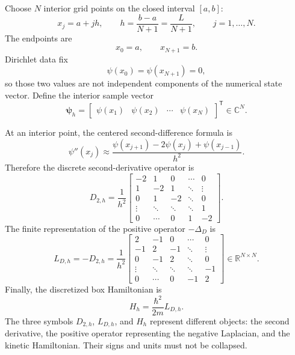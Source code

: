 Choose \(N\) interior grid points on the closed interval \([a,b]\):
\begin{equation}
  x_j=a+jh,
  \qquad
  h=\frac{b-a}{N+1}=\frac{L}{N+1},
  \qquad
  j=1,\ldots,N.
\end{equation}
The endpoints are
\begin{equation}
  x_0=a,
  \qquad
  x_{N+1}=b.
\end{equation}
Dirichlet data fix
\begin{equation}
  \psi(x_0)=\psi(x_{N+1})=0,
\end{equation}
so those two values are not independent components of the numerical state
vector. Define the interior sample vector
\begin{equation}
  \boldsymbol\psi_h
  =
  \begin{bmatrix}
    \psi(x_1) & \psi(x_2) & \cdots & \psi(x_N)
  \end{bmatrix}^{\mathsf T}
  \in\mathbb C^N.
\end{equation}

At an interior point, the centered second-difference formula is
\begin{equation}
  \psi''(x_j)
  \approx
  \frac{\psi(x_{j+1})-2\psi(x_j)+\psi(x_{j-1})}{h^2}.
\end{equation}
Therefore the discrete second-derivative operator is
\begin{equation}
  D_{2,h}
  =\frac{1}{h^2}
  \begin{bmatrix}
    -2 & 1 & 0 & \cdots & 0\\
    1 & -2 & 1 & \ddots & \vdots\\
    0 & 1 & -2 & \ddots & 0\\
    \vdots & \ddots & \ddots & \ddots & 1\\
    0 & \cdots & 0 & 1 & -2
  \end{bmatrix}.
\end{equation}
The finite representation of the positive operator \(-\Delta_D\) is
\begin{equation}
  L_{D,h}=-D_{2,h}
  =\frac{1}{h^2}
  \begin{bmatrix}
    2 & -1 & 0 & \cdots & 0\\
    -1 & 2 & -1 & \ddots & \vdots\\
    0 & -1 & 2 & \ddots & 0\\
    \vdots & \ddots & \ddots & \ddots & -1\\
    0 & \cdots & 0 & -1 & 2
  \end{bmatrix}
  \in\mathbb R^{N\times N}.
\end{equation}
Finally, the discretized box Hamiltonian is
\begin{equation}
  H_h=\frac{\hbar^2}{2m}L_{D,h}.
\end{equation}
The three symbols \(D_{2,h}\), \(L_{D,h}\), and \(H_h\) represent different
objects: the second derivative, the positive operator representing the
negative Laplacian, and the kinetic Hamiltonian. Their signs and units must not
be collapsed.


